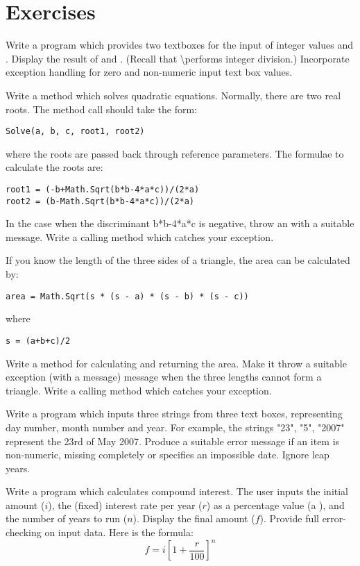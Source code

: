 	\section{Exercises}
		\begin{EXE}
		\item	Write a program which provides two textboxes for the input of integer values  and . Display the result of  and . (Recall that \textbackslash performs integer division.) Incorporate exception handling for zero and non-numeric input text box values.
			\item	Write a method which solves quadratic equations. Normally, there are two real roots. The method call should take the form:
				\begin{lstlisting}
Solve(a, b, c, root1, root2)
				\end{lstlisting}
				where the roots are passed back through reference parameters. The formulae to calculate the roots are:
				\begin{lstlisting}
root1 = (-b+Math.Sqrt(b*b-4*a*c))/(2*a)
root2 = (b-Math.Sqrt(b*b-4*a*c))/(2*a)
				\end{lstlisting}
				In the case when the discriminant b*b-4*a*c is negative, throw an  with a suitable message. Write a calling method which catches your exception.
			\item If you know the length of the three sides of a triangle, the area can be calculated by:
				\begin{lstlisting}
area = Math.Sqrt(s * (s - a) * (s - b) * (s - c))
				\end{lstlisting}
	where
				\begin{lstlisting}
s = (a+b+c)/2
				\end{lstlisting}
				Write a method for calculating and returning the area. Make it throw a suitable exception (with a message) message when the three lengths cannot form a triangle. Write a calling method which catches your exception.
			\item	Write a program which inputs three strings from three text boxes, representing day number, month number and year. For example, the strings "23", "5", "2007" represent the 23rd of May 2007. Produce a suitable error message if an item is non-numeric, missing completely or specifies an impossible date. Ignore leap years.
			\item Write a program which calculates compound interest. The user inputs the initial amount ($i$), the (fixed) interest rate per year ($r$) as a percentage value (a ), and the number of years to run ($n$). Display the final amount ($f$). Provide full error-checking on input data. Here is the formula:
				\begin{equation*}
					f = i \left[ 1 + \frac{r}{100}\right]^n
				\end{equation*}
			\end{EXE}


